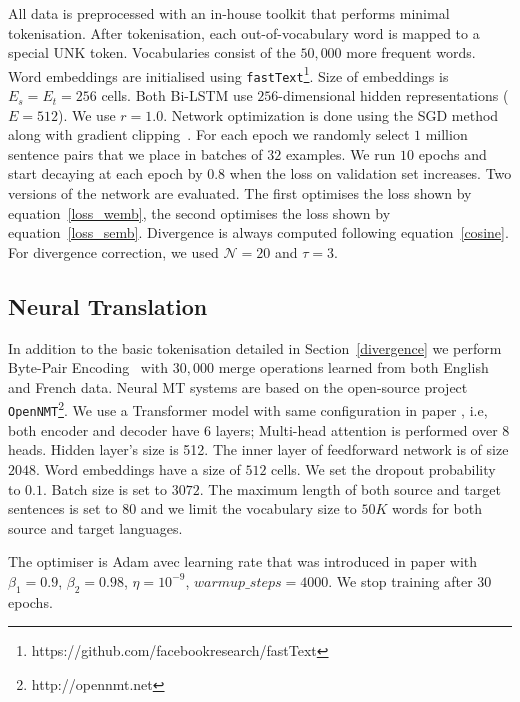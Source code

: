 \documentclass[11pt,a4paper]{article}
\begin{document}
All data is preprocessed with an in-house toolkit that performs minimal tokenisation. %
After tokenisation, each out-of-vocabulary word is mapped to a special UNK token.
Vocabularies consist of the $50,000$ more frequent words.
Word embeddings are initialised using \texttt{fastText}\footnote{https://github.com/facebookresearch/fastText}. %
Size of embeddings is $E_s=E_t=256$ cells. 
Both Bi-LSTM use $256$-dimensional hidden representations ($E=512$).
We use $r=1.0$. 
Network optimization is done using the SGD method along with gradient clipping~\cite{Pascanu:2013:DTR:3042817.3043083}. 
For each epoch we randomly select $1$ million sentence pairs that we place in batches of $32$ examples.  
We run $10$ epochs and start decaying at each epoch by $0.8$ when the loss on validation set increases. 
Two versions of the network are evaluated. 
The first optimises the loss shown by equation~\ref{loss_wemb}, the second optimises the loss shown by equation~\ref{loss_semb}. 
Divergence is always computed following equation~\ref{cosine}. 
For divergence correction, we used $\mathcal{N}=20$ and $\tau=3$.

\subsection{Neural Translation}
\label{translation}

In addition to the basic tokenisation detailed in Section~\ref{divergence} we perform Byte-Pair Encoding~\cite{Sennrich2016} with $30,000$ merge operations learned from both English and French data.
Neural MT systems are based on the open-source project \texttt{OpenNMT}\footnote{http://opennmt.net}. We use a Transformer model with same configuration in paper \cite{Transformer2017}, i.e, both encoder and decoder have 6 layers; Multi-head attention is performed over 8 heads. Hidden layer's size is 512. The inner layer of feedforward network is of size $2048$. Word embeddings have a size of $512$ cells. We set the dropout probability to $0.1$. Batch size is set to $3072$. The maximum length of both source and target sentences is set to $80$ and we limit the vocabulary size to $50K$ words for both source and target languages.

The optimiser is Adam avec learning rate that was introduced in paper \cite{Transformer2017} with $\beta_1 = 0.9$, $\beta_2 = 0.98$, $\eta = 10^{-9}$, $warmup\_steps = 4000$. We stop training after 30 epochs.
\end{document}
